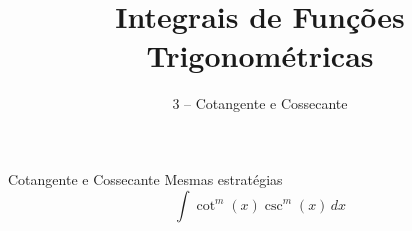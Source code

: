 
\usepackage{integracao_e_series}

\title{Integrais de Funções Trigonométricas}
\subtitle{3 -- Cotangente e Cossecante}



\addtitle

\begin{frame}{Cotangente e Cossecante}
  Mesmas estratégias
  \[
    \int \cot^m(x) \csc^m(x)\,dx
  \]
\end{frame}

%
%
%
%
%
%


